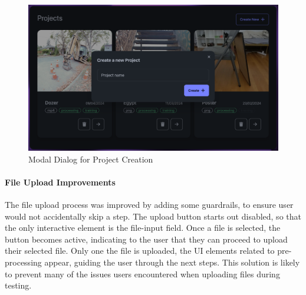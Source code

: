 \begin{figure}[htb]
	\includegraphics[width=\textwidth]{figures/fix-3.png}
	\caption{Modal Dialog for Project Creation}
  \label{fig:fix-3}
\end{figure}

\paragraph{File Upload Improvements}
The file upload process was improved by adding some guardrails, to ensure user would not accidentally skip a step. 
The upload button starts out disabled, so that the only interactive element is the file-input field.
Once a file is selected, the button becomes active, indicating to the user that they can proceed to upload their selected file.
Only one the file is uploaded, the UI elements related to pre-processing appear, guiding the user through the next steps. 
This solution is likely to prevent many of the issues users encountered when uploading files during testing. 



